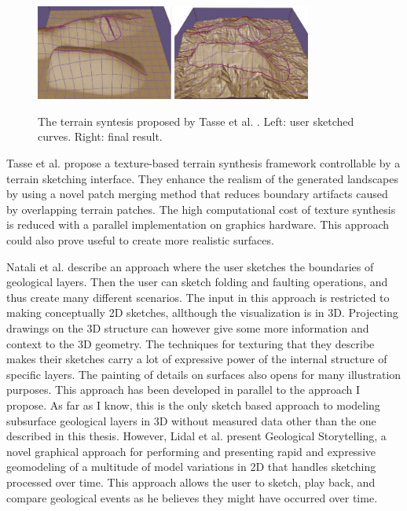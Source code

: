 \documentclass[a4paper,12pt]{report}
\begin{document}
\begin{figure}
 \centering
 \includegraphics[width=0.4\textwidth]{thesis/related/tasse1.png}
 \includegraphics[width=0.4\textwidth]{thesis/related/tasse2.png}
 \caption{The terrain syntesis proposed by Tasse et al. \cite{tasse2012enhanced}. Left: user sketched curves. Right: final result. }
 \label{fig:tasse}
\end{figure}

 
 
Tasse et al. \cite{tasse2012enhanced} propose a texture-based terrain synthesis framework controllable by
a terrain sketching interface. They enhance the realism of the generated landscapes by using a novel patch merging
method that reduces boundary artifacts caused by overlapping terrain patches. The high computational cost of texture
synthesis is reduced with a parallel implementation on graphics hardware. This approach could also prove useful to create more realistic surfaces.


Natali et al. \cite{natalirapid} describe an approach where the user sketches the boundaries of geological layers. Then the user can sketch folding and faulting operations, and thus create many different scenarios. The input in this approach is restricted to making conceptually 2D sketches, allthough the visualization is in 3D. Projecting drawings on the 3D structure can however give some more information and context to the 3D geometry. The techniques for texturing that they describe makes their sketches carry a lot of expressive power of the internal structure of specific layers. The painting of details on surfaces also opens for many illustration purposes. This approach has been developed in parallel to the approach I propose. As far as I know, this is the only sketch based approach to modeling subsurface geological layers in 3D without measured data other than the one described in this thesis. However, Lidal et al. \cite{lidal2012geological} present Geological Storytelling, a novel graphical approach for 
performing and presenting rapid and expressive geomodeling of a multitude of model variations in 2D that handles sketching processed over time. This approach allows the user to sketch,  play back, and compare geological events as he believes they might have occurred over time.
\end{document}
